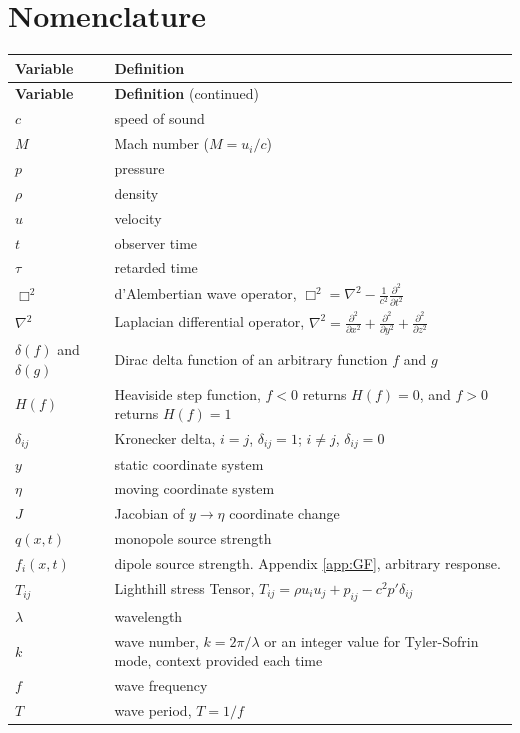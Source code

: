 
\chapter*{Nomenclature}

\begin{longtable}{p{2.5cm} p{13.5cm}}
\textbf{Variable} & \textbf{Definition} \\
\endfirsthead

\textbf{Variable} & \textbf{Definition} (continued) \\
\endhead

$c$ & speed of sound \\
$M$ & Mach number ($M = u_i/c$) \\
$p$ & pressure \\
$\rho$ & density \\
$u$ & velocity \\
$t$ & observer time \\
$\tau$ & retarded time \\
$\Box^2$ & d'Alembertian wave operator, $\Box^2 = \nabla^2 - \frac{1}{c^2}\frac{\partial^2}{\partial t^2}$ \\
$\nabla^2$ & Laplacian differential operator, $\nabla^2 = \frac{\partial^2}{\partial x^2} + \frac{\partial^2}{\partial y^2} + \frac{\partial^2}{\partial z^2}$ \\
$\delta(f)$ and $\delta(g)$ & Dirac delta function of an arbitrary function $f$ and $g$ \\
$H(f)$ & Heaviside step function, $f<0$ returns $H(f)=0$, and $f>0$ returns $H(f)=1$ \\
$\delta_{ij}$ & Kronecker delta, $i=j$, $\delta_{ij}=1$; $i \neq j$, $\delta_{ij}=0$ \\
$y$ & static coordinate system \\
$\eta$ & moving coordinate system \\
$J$ & Jacobian of $y \rightarrow \eta$ coordinate change \\
$q(x,t)$ & monopole source strength \\
$f_i(x,t)$ & dipole source strength. Appendix \ref{app:GF}, arbitrary response. \\
$T_{ij}$ & Lighthill stress Tensor, $T_{ij} = \rho u_i u_j + p_{ij} - c^2 p' \delta_{ij}$ \\
$\lambda$ & wavelength \\
$k$ & wave number, $k=2\pi/\lambda$ or an integer value for Tyler-Sofrin mode, context provided each time \\
$f$ & wave frequency \\
$T$ & wave period, $T=1/f$ \\


\end{longtable}
